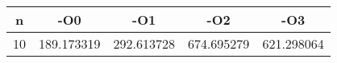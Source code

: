 \begin{center}
	\begin{tabular}{|c|c|c|c|c|}
		\hline
		 n & -O0 & -O1 & -O2 & -O3\\
		\hline
		 10 & 189.173319 & 292.613728 & 674.695279 & 621.298064\\
		\hline
	\end{tabular}
\end{center}